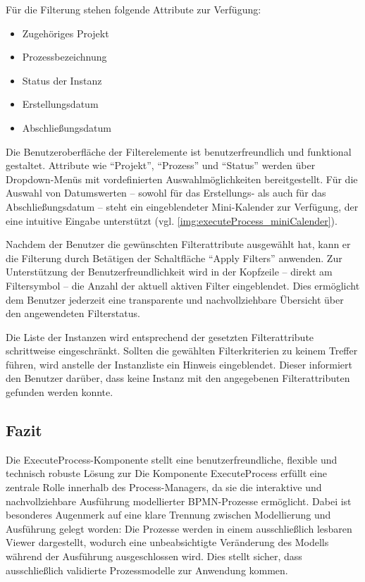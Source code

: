 Für die Filterung stehen folgende Attribute zur Verfügung:
\begin{itemize}
  \item Zugehöriges Projekt
  \item Prozessbezeichnung
  \item Status der Instanz
  \item Erstellungsdatum
  \item Abschließungsdatum
\end{itemize}

Die Benutzeroberfläche der Filterelemente ist benutzerfreundlich und funktional gestaltet. Attribute wie \enquote{Projekt}, \enquote{Prozess} und \enquote{Status} werden über Dropdown-Menüs mit vordefinierten Auswahlmöglichkeiten bereitgestellt. Für die Auswahl von Datumswerten – sowohl für das Erstellungs- als auch für das Abschließungsdatum – steht ein eingeblendeter Mini-Kalender zur Verfügung, der eine intuitive Eingabe unterstützt (vgl. \autoref{img:executeProcess_miniCalender}).



Nachdem der Benutzer die gewünschten Filterattribute ausgewählt hat, kann er die Filterung durch Betätigen der Schaltfläche \enquote{Apply Filters} anwenden. Zur Unterstützung der Benutzerfreundlichkeit wird in der Kopfzeile – direkt am Filtersymbol – die Anzahl der aktuell aktiven Filter eingeblendet. Dies ermöglicht dem Benutzer jederzeit eine transparente und nachvollziehbare Übersicht über den angewendeten Filterstatus.


Die Liste der Instanzen wird entsprechend der gesetzten Filterattribute schrittweise eingeschränkt. Sollten die gewählten Filterkriterien zu keinem Treffer führen, wird anstelle der Instanzliste ein Hinweis eingeblendet. Dieser informiert den Benutzer darüber, dass keine Instanz mit den angegebenen Filterattributen gefunden werden konnte.


\newpage
\subsection*{Fazit}
Die ExecuteProcess-Komponente stellt eine benutzerfreundliche, flexible und technisch robuste Lösung zur Die Komponente ExecuteProcess erfüllt eine zentrale Rolle innerhalb des Process-Managers, da sie die interaktive und nachvollziehbare Ausführung modellierter BPMN-Prozesse ermöglicht. Dabei ist besonderes Augenmerk auf eine klare Trennung zwischen Modellierung und Ausführung gelegt worden: Die Prozesse werden in einem ausschließlich lesbaren Viewer dargestellt, wodurch eine unbeabsichtigte Veränderung des Modells während der Ausführung ausgeschlossen wird. Dies stellt sicher, dass ausschließlich validierte Prozessmodelle zur Anwendung kommen.

